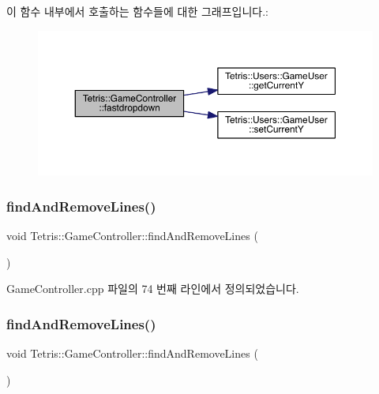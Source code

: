이 함수 내부에서 호출하는 함수들에 대한 그래프입니다.\+:
\nopagebreak
\begin{figure}[H]
\begin{center}
\leavevmode
\includegraphics[width=350pt]{class_tetris_1_1_game_controller_a8d5b65ec7638519a39b4ba8a71e67fff_cgraph}
\end{center}
\end{figure}
\mbox{\label{class_tetris_1_1_game_controller_ab19e8563acc9e724e130de60f87600b7}} 
\subsubsection{\texorpdfstring{find\+And\+Remove\+Lines()}{findAndRemoveLines()}\hspace{0.1cm}{\footnotesize\ttfamily [1/2]}}
{\footnotesize\ttfamily void Tetris\+::\+Game\+Controller\+::find\+And\+Remove\+Lines (\begin{DoxyParamCaption}{ }\end{DoxyParamCaption})}



Game\+Controller.\+cpp 파일의 74 번째 라인에서 정의되었습니다.

\mbox{\label{class_tetris_1_1_game_controller_ab19e8563acc9e724e130de60f87600b7}} 
\subsubsection{\texorpdfstring{find\+And\+Remove\+Lines()}{findAndRemoveLines()}\hspace{0.1cm}{\footnotesize\ttfamily [2/2]}}
{\footnotesize\ttfamily void Tetris\+::\+Game\+Controller\+::find\+And\+Remove\+Lines (\begin{DoxyParamCaption}{ }\end{DoxyParamCaption})\hspace{0.3cm}{\ttfamily [inline]}}



